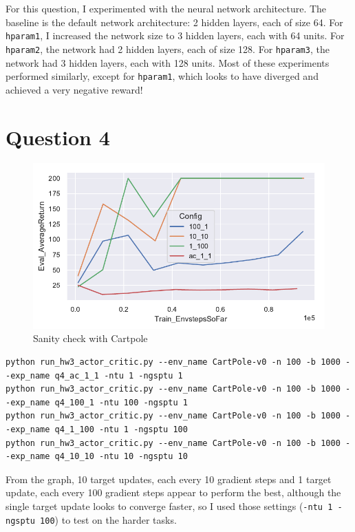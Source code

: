 \documentclass[letterpaper, 10pt]{article}
\begin{document}
For this question, I experimented with the neural network architecture. The baseline is the default network architecture:
2 hidden layers, each of size 64. For \texttt{hparam1}, I increased the network size to 3 hidden layers, each with 64 units.
For \texttt{hparam2}, the network had 2 hidden layers, each of size 128. For \texttt{hparam3}, the network had 3 hidden layers,
each with 128 units. Most of these experiments performed similarly, except for \texttt{hparam1}, which looks to have diverged
and achieved a very negative reward!

\newpage

\section{Question 4}
\begin{figure}[h]
\centering
\includegraphics{figures/q4.pdf}
\caption{Sanity check with Cartpole}
\end{figure}

\begin{lstlisting}[caption=Exact command line configurations]
python run_hw3_actor_critic.py --env_name CartPole-v0 -n 100 -b 1000 --exp_name q4_ac_1_1 -ntu 1 -ngsptu 1
python run_hw3_actor_critic.py --env_name CartPole-v0 -n 100 -b 1000 --exp_name q4_100_1 -ntu 100 -ngsptu 1
python run_hw3_actor_critic.py --env_name CartPole-v0 -n 100 -b 1000 --exp_name q4_1_100 -ntu 1 -ngsptu 100
python run_hw3_actor_critic.py --env_name CartPole-v0 -n 100 -b 1000 --exp_name q4_10_10 -ntu 10 -ngsptu 10
\end{lstlisting}

From the graph, 10 target updates, each every 10 gradient steps and 1 target update, each every 100 gradient steps appear to
perform the best, although the single target update looks to converge faster, so I used those settings (\texttt{-ntu 1 -ngsptu 100})
to test on the harder tasks.
\end{document}
